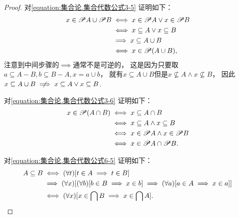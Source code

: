 \begin{property}
\begin{proof}
对\cref{equation:集合论.集合代数公式3-5} 证明如下：
\begin{align*}
	x \in \mathscr{P} A \cup \mathscr{P} B
	&\iff x \in \mathscr{P} A \lor x \in \mathscr{P} B \\
	&\iff x \subseteq A \lor x \subseteq B \\
	&\implies x \subseteq A \cup B \\
	&\iff x \in \mathscr{P} (A \cup B),
\end{align*}
注意到中间步骤的\(\implies\)通常不是可逆的，
这是因为只要取\(a \subseteq A - B, b \subseteq B - A, x = a \cup b\)，
就有\(x \subseteq A \cup B\)但是\(x \not\subseteq A \land x \not\subseteq B\)，
因此\(x \subseteq A \cup B \notimplies x \subseteq A \lor x \subseteq B\).

对\cref{equation:集合论.集合代数公式3-6} 证明如下：
\begin{align*}
	x \in \mathscr{P} (A \cap B)
	&\iff x \subseteq A \cap B \\
	&\iff x \subseteq A \land x \subseteq B \\
	&\iff x \in \mathscr{P} A \land x \in \mathscr{P} B \\
	&\iff x \in \mathscr{P} A \cap \mathscr{P} B.
\end{align*}

对\cref{equation:集合论.集合代数公式6-5} 证明如下：
\begin{align*}
	A \subseteq B
	&\iff (\forall t)[t \in A \implies t \in B] \\
	&\implies (\forall x)[
		(\forall b)[b \in B \implies x \in b]
		\implies
		(\forall a)[a \in A \implies x \in a]
	] \\
	&\iff (\forall x)[x \in \bigcap B \implies x \in \bigcap A].
	\qedhere
\end{align*}
\end{proof}
\end{property}

